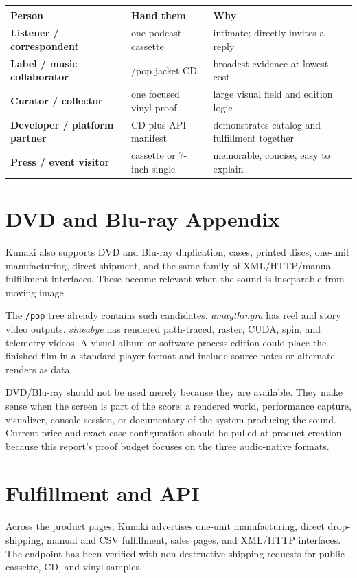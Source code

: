 \documentclass[11pt]{article}
\newcommand{\mediumtitle}[1]{\section*{\Huge\color{acpink}#1}}
\begin{document}
\begin{tabularx}{\textwidth}{>{\bfseries}l X X}
\toprule
Person & Hand them & Why \\
\midrule
Listener / correspondent & one podcast cassette & intimate; directly invites a reply \\
Label / music collaborator & /pop jacket CD & broadest evidence at lowest cost \\
Curator / collector & one focused vinyl proof & large visual field and edition logic \\
Developer / platform partner & CD plus API manifest & demonstrates catalog and fulfillment together \\
Press / event visitor & cassette or 7-inch single & memorable, concise, easy to explain \\
\bottomrule
\end{tabularx}

\clearpage
\mediumtitle{DVD and Blu-ray Appendix}

Kunaki also supports DVD and Blu-ray duplication, cases, printed discs, one-unit manufacturing, direct shipment, and the same family of XML/HTTP/manual fulfillment interfaces. These become relevant when the sound is inseparable from moving image.

The \texttt{/pop} tree already contains such candidates. \textit{amaythingra} has reel and story video outputs. \textit{sineabye} has rendered path-traced, raster, CUDA, spin, and telemetry videos. A visual album or software-process edition could place the finished film in a standard player format and include source notes or alternate renders as data.

DVD/Blu-ray should not be used merely because they are available. They make sense when the screen is part of the score: a rendered world, performance capture, visualizer, console session, or documentary of the system producing the sound. Current price and exact case configuration should be pulled at product creation because this report's proof budget focuses on the three audio-native formats.

\section*{Fulfillment and API}

Across the product pages, Kunaki advertises one-unit manufacturing, direct drop-shipping, manual and CSV fulfillment, sales pages, and XML/HTTP interfaces. The endpoint has been verified with non-destructive shipping requests for public cassette, CD, and vinyl samples.
\end{document}
